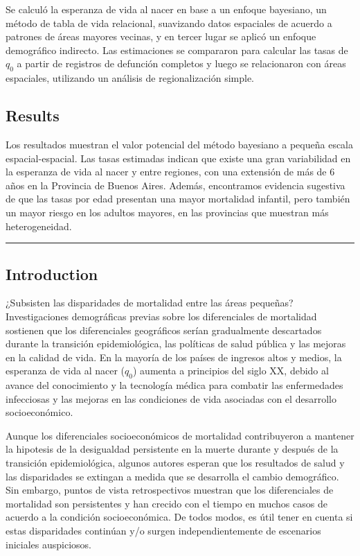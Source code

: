 \documentclass[12pt,]{article}
\begin{document}
Se calculó la esperanza de vida al nacer en base a un enfoque bayesiano,
un método de tabla de vida relacional, suavizando datos espaciales de
acuerdo a patrones de áreas mayores vecinas, y en tercer lugar se aplicó
un enfoque demográfico indirecto. Las estimaciones se compararon para
calcular las tasas de \(q_0\) a partir de registros de defunción
completos y luego se relacionaron con áreas espaciales, utilizando un
análisis de regionalización simple.

\hypertarget{results}{%
\subsection{\texorpdfstring{\textbf{Results}}{Results}}\label{results}}

Los resultados muestran el valor potencial del método bayesiano a
pequeña escala espacial-espacial. Las tasas estimadas indican que existe
una gran variabilidad en la esperanza de vida al nacer y entre regiones,
con una extensión de más de 6 años en la Provincia de Buenos Aires.
Además, encontramos evidencia sugestiva de que las tasas por edad
presentan una mayor mortalidad infantil, pero también un mayor riesgo en
los adultos mayores, en las provincias que muestran más heterogeneidad.

\begin{center}\rule{0.5\linewidth}{0.5pt}\end{center}

\hypertarget{introduction}{%
\subsection{\texorpdfstring{\textbf{Introduction}}{Introduction}}\label{introduction}}

¿Subsisten las disparidades de mortalidad entre las áreas pequeñas?
Investigaciones demográficas previas sobre los diferenciales de
mortalidad sostienen que los diferenciales geográficos serían
gradualmente descartados durante la transición epidemiológica, las
políticas de salud pública y las mejoras en la calidad de vida. En la
mayoría de los países de ingresos altos y medios, la esperanza de vida
al nacer (\(q_0\)) aumenta a principios del siglo XX, debido al avance
del conocimiento y la tecnología médica para combatir las enfermedades
infecciosas y las mejoras en las condiciones de vida asociadas con el
desarrollo socioeconómico.

Aunque los diferenciales socioeconómicos de mortalidad contribuyeron a
mantener la hipotesis de la desigualdad persistente en la muerte durante
y después de la transición epidemiológica, algunos autores esperan que
los resultados de salud y las disparidades se extingan a medida que se
desarrolla el cambio demográfico. Sin embargo, puntos de vista
retrospectivos muestran que los diferenciales de mortalidad son
persistentes y han crecido con el tiempo en muchos casos de acuerdo a la
condición socioeconómica. De todos modos, es útil tener en cuenta si
estas disparidades continúan y/o surgen independientemente de escenarios
iniciales auspiciosos.
\end{document}
